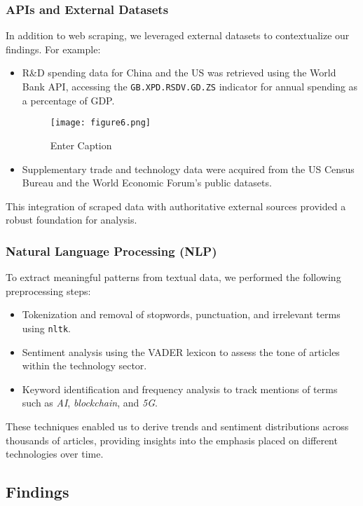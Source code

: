 \documentclass{article}
\begin{document}
\subsubsection{APIs and External Datasets}

In addition to web scraping, we leveraged external datasets to contextualize our findings. For example:
\begin{itemize}
    \item R\&D spending data for China and the US was retrieved using the World Bank API, accessing the \texttt{GB.XPD.RSDV.GD.ZS} indicator for annual spending as a percentage of GDP.
\begin{figure}
        \centering
        \texttt{[image: figure6.png]}
        \caption{Enter Caption}
        \label{fig:enter-label}
    \end{figure}
        \item Supplementary trade and technology data were acquired from the US Census Bureau and the World Economic Forum’s public datasets.
\end{itemize}

This integration of scraped data with authoritative external sources provided a robust foundation for analysis.

\subsubsection{Natural Language Processing (NLP)}

To extract meaningful patterns from textual data, we performed the following preprocessing steps:
\begin{itemize}
    \item Tokenization and removal of stopwords, punctuation, and irrelevant terms using \texttt{nltk}.
    \item Sentiment analysis using the VADER lexicon to assess the tone of articles within the technology sector.
    \item Keyword identification and frequency analysis to track mentions of terms such as \textit{AI}, \textit{blockchain}, and \textit{5G}.
\end{itemize}

These techniques enabled us to derive trends and sentiment distributions across thousands of articles, providing insights into the emphasis placed on different technologies over time.

\subsection{Findings}
\end{document}
